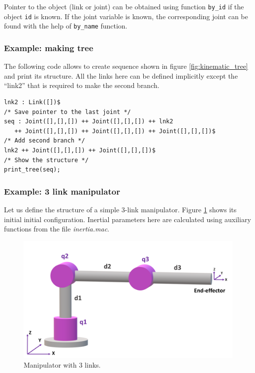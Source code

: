 \documentclass{article}
\begin{document}
Pointer to the object (link or joint) can be obtained using function \texttt{by\_id} if the object \texttt{id} is known. If the joint variable is known, the corresponding joint can be found with the help of \texttt{by\_name} function. 

\subsubsection{Example: making tree}

The following code allows to create sequence shown in figure \ref{fig:kinematic_tree} and print its structure. All the links here can be defined implicitly except the ``link2'' that is required to make the second branch. 
\begin{verbatim}
lnk2 : Link([])$ 
/* Save pointer to the last joint */
seq : Joint([],[],[]) ++ Joint([],[],[]) ++ lnk2 
   ++ Joint([],[],[]) ++ Joint([],[],[]) ++ Joint([],[],[])$
/* Add second branch */
lnk2 ++ Joint([],[],[]) ++ Joint([],[],[])$
/* Show the structure */
print_tree(seq);
\end{verbatim}

\subsubsection{Example: 3 link manipulator}
\label{ex:3link}

Let us define the structure of a simple 3-link manipulator. Figure \ref{fig:3_links} shows its initial initial configuration. Inertial parameters here are calculated using auxiliary functions from the file \textit{inertia.mac}.  

\begin{figure}[t]
    \centering
    \includegraphics[width=0.8\linewidth]{img/scheme_jnt.png}
    \caption{Manipulator with 3 links.}
    \label{fig:3_links}
\end{figure}
\end{document}
